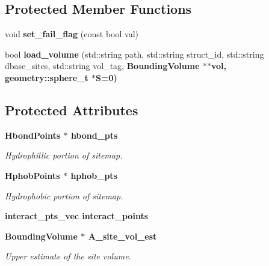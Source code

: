 \subsection*{Protected Member Functions}
\begin{CompactItemize}
\item 
void \textbf{set\_\-fail\_\-flag} (const bool val)\label{classSimSite3D_1_1Sitemap_e250f1412ec1750e343811d8582cd562}

\item 
bool \textbf{load\_\-volume} (std::string path, std::string struct\_\-id, std::string dbase\_\-sites, std::string vol\_\-tag, \bf{Bounding\-Volume} $\ast$$\ast$vol, geometry::sphere\_\-t $\ast$S=0)\label{classSimSite3D_1_1Sitemap_79a3b9c79bdd450b23932618525d67ae}

\end{CompactItemize}
\subsection*{Protected Attributes}
\begin{CompactItemize}
\item 
\bf{Hbond\-Points} $\ast$ \bf{hbond\_\-pts}\label{classSimSite3D_1_1Sitemap_dcd2dacc1cda6d35e9e477e38ab1af5b}

\begin{CompactList}\small\item\em Hydrophillic portion of sitemap. \item\end{CompactList}\item 
\bf{Hphob\-Points} $\ast$ \bf{hphob\_\-pts}\label{classSimSite3D_1_1Sitemap_89271f4fedad4a8435ff3f30e58bb7f7}

\begin{CompactList}\small\item\em Hydrophobic portion of sitemap. \item\end{CompactList}\item 
\bf{interact\_\-pts\_\-vec} \textbf{interact\_\-points}\label{classSimSite3D_1_1Sitemap_ff5f52340679a7c4c44521a8f7218324}

\item 
\bf{Bounding\-Volume} $\ast$ \bf{A\_\-site\_\-vol\_\-est}\label{classSimSite3D_1_1Sitemap_cb78a63c2111c987ecd011d1dd3d1ce0}

\begin{CompactList}\small\item\em Upper estimate of the site volume. \item\end{CompactList}\end{CompactItemize}
